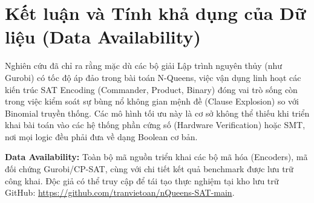 \documentclass[a4paper,fleqn,numbers]{cas-sc}
\begin{document}
    \section{Kết luận và Tính khả dụng của Dữ liệu (Data Availability)}\label{sec:conclusion}
    Nghiên cứu đã chỉ ra rằng mặc dù các bộ giải Lập trình nguyên thủy (như Gurobi) có tốc độ áp đảo trong bài toán
    N-Queens, việc vận dụng linh hoạt các kiến trúc SAT Encoding (Commander, Product, Binary) đóng vai trò sống còn
    trong việc kiểm soát sự bùng nổ không gian mệnh đề (Clause Explosion) so với Binomial truyền thống. Các mô hình tối
    ưu này là cơ sở không thể thiếu khi triển khai bài toán vào các hệ thống phần cứng số (Hardware Verification) hoặc
    SMT, nơi mọi logic đều phải đưa về dạng Boolean cơ bản.

    \textbf{Data Availability:}
    Toàn bộ mã nguồn triển khai các bộ mã hóa (Encoders), mã đối chứng Gurobi/CP-SAT, cùng với chi tiết kết quả
    benchmark được lưu trữ công khai. Độc giả có thể truy cập để tái tạo thực nghiệm tại kho lưu
    trữ GitHub: \url{https://github.com/tranvietoan/nQueens-SAT-main}\cite{ref_3}.

    
    
\end{document}
